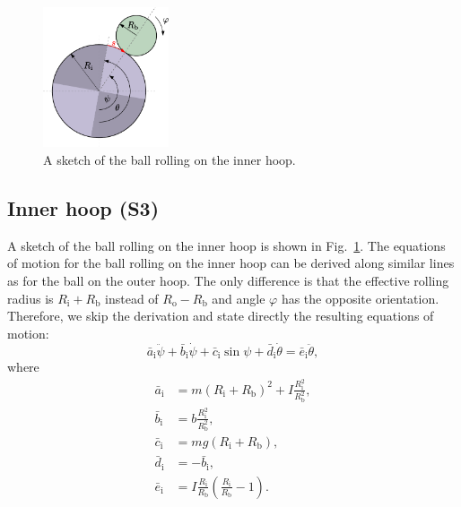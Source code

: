 \documentclass{ifacconf}
\begin{document}
\begin{figure}
\begin{center}
\includegraphics[width=3.7cm]{figs/inner}    %
\caption{A sketch of the ball rolling on the inner hoop.}
\label{fig:model_sketch_inner}
\end{center}
\end{figure}

\subsection{Inner hoop (S3)} %
\label{sub:inner_hoop}
A sketch of the ball rolling on the inner hoop is shown in Fig.~\ref{fig:model_sketch_inner}. The equations of motion for the ball rolling on the inner hoop can be derived along similar lines as for the ball on the outer hoop. The only difference is that the effective rolling radius is $R_\mathrm{i}+R_\mathrm{b}$ instead of $R_\mathrm{o}-R_\mathrm{b}$ and angle $\varphi$ has the opposite orientation. Therefore, we skip the derivation and state directly the resulting equations of motion:
\begin{equation}
  \bar{a}_\mathrm{i}\ddot{\psi} + \bar{b}_\mathrm{i}\dot{\psi} + \bar{c}_\mathrm{i}\sin\psi + \bar{d}_\mathrm{i}\dot{\theta} = \bar{e}_\mathrm{i}\ddot{\theta},
\end{equation}
where
\begin{subequations}
  \begin{align}
    \bar{a}_\mathrm{i} &= m \left(R_\mathrm{i}+R_\mathrm{b}\right)^2 + I \frac{R_\mathrm{i}^2}{R_\mathrm{b}^2}, \\
    \bar{b}_\mathrm{i} &= b  \frac{R_\mathrm{i}^2}{R_\mathrm{b}^2}, \\
    \bar{c}_\mathrm{i} &= m g \left(R_\mathrm{i}+R_\mathrm{b}\right), \\
    \bar{d}_\mathrm{i} &= -\bar{b}_\mathrm{i}, \\
    \bar{e}_\mathrm{i} &= I \frac{R_\mathrm{i}}{R_\mathrm{b}}\left( \frac{R_\mathrm{i}}{R_\mathrm{b}} - 1 \right).
  \end{align}
\end{subequations}
\end{document}
